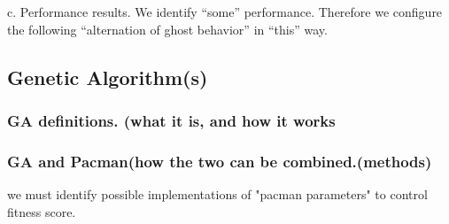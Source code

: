 c. Performance results. We identify “some” performance. Therefore we configure the following “alternation of ghost behavior” in “this” way.

\subsection{Genetic Algorithm(s)}

\subsubsection{GA definitions. (what it is, and how it works}
\subsubsection{GA and Pacman(how the two can be combined.(methods)}
we must identify possible implementations of "pacman parameters" to control fitness score.
